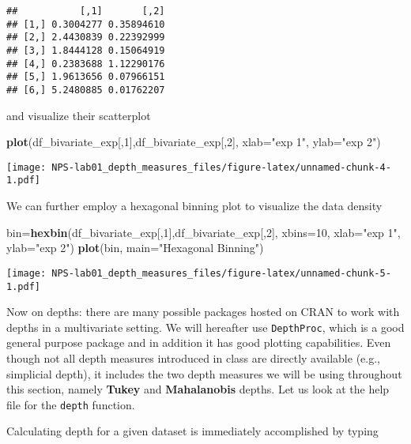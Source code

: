\documentclass[
]{article}
\newenvironment{Shaded}{\begin{snugshade}}{\end{snugshade}}
\newcommand{\AttributeTok}[1]{\textcolor[rgb]{0.13,0.29,0.53}{#1}}
\newcommand{\DecValTok}[1]{\textcolor[rgb]{0.00,0.00,0.81}{#1}}
\newcommand{\FunctionTok}[1]{\textcolor[rgb]{0.13,0.29,0.53}{\textbf{#1}}}
\newcommand{\NormalTok}[1]{#1}
\newcommand{\OtherTok}[1]{\textcolor[rgb]{0.56,0.35,0.01}{#1}}
\newcommand{\StringTok}[1]{\textcolor[rgb]{0.31,0.60,0.02}{#1}}
\begin{document}
\begin{verbatim}
##           [,1]       [,2]
## [1,] 0.3004277 0.35894610
## [2,] 2.4430839 0.22392999
## [3,] 1.8444128 0.15064919
## [4,] 0.2383688 1.12290176
## [5,] 1.9613656 0.07966151
## [6,] 5.2480885 0.01762207
\end{verbatim}

and visualize their scatterplot

\begin{Shaded}
\begin{Highlighting}[]
\FunctionTok{plot}\NormalTok{(df\_bivariate\_exp[,}\DecValTok{1}\NormalTok{],df\_bivariate\_exp[,}\DecValTok{2}\NormalTok{], }\AttributeTok{xlab=}\StringTok{"exp 1"}\NormalTok{, }\AttributeTok{ylab=}\StringTok{"exp 2"}\NormalTok{)}
\end{Highlighting}
\end{Shaded}

\texttt{[image: NPS-lab01\_depth\_measures\_files/figure-latex/unnamed-chunk-4-1.pdf]}

We can further employ a hexagonal binning plot to visualize the data
density

\begin{Shaded}
\begin{Highlighting}[]
\NormalTok{bin}\OtherTok{=}\FunctionTok{hexbin}\NormalTok{(df\_bivariate\_exp[,}\DecValTok{1}\NormalTok{],df\_bivariate\_exp[,}\DecValTok{2}\NormalTok{], }\AttributeTok{xbins=}\DecValTok{10}\NormalTok{, }\AttributeTok{xlab=}\StringTok{"exp 1"}\NormalTok{, }\AttributeTok{ylab=}\StringTok{"exp 2"}\NormalTok{)}
\FunctionTok{plot}\NormalTok{(bin, }\AttributeTok{main=}\StringTok{"Hexagonal Binning"}\NormalTok{) }
\end{Highlighting}
\end{Shaded}

\texttt{[image: NPS-lab01\_depth\_measures\_files/figure-latex/unnamed-chunk-5-1.pdf]}

Now on depths: there are many possible packages hosted on CRAN to work
with depths in a multivariate setting. We will hereafter use
\texttt{DepthProc}, which is a good general purpose package and in
addition it has good plotting capabilities. Even though not all depth
measures introduced in class are directly available (e.g., simplicial
depth), it includes the two depth measures we will be using throughout
this section, namely \textbf{Tukey} and \textbf{Mahalanobis} depths. Let
us look at the help file for the \texttt{depth} function.

Calculating depth for a given dataset is immediately accomplished by
typing
\end{document}
